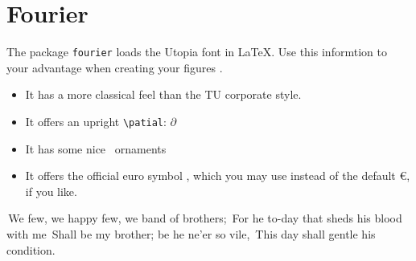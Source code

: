 \section{Fourier}

The package \texttt{fourier} loads the Utopia font in \LaTeX. Use this informtion to your advantage when creating your figures \textthing.

\begin{itemize}
    \renewcommand\labelitemi\lefthand
    \item It has a more classical feel than the TU corporate style.
    \item It offers an upright \verb|\patial|: \(\partial\)
    \item It has some nice \floweroneleft\ ornaments \floweroneright
    \item It offers the official euro symbol \eurologo, which you may use instead of the default €, if you like.
\end{itemize}

\textcolor{newred}{\oldpilcrowfour}\,We few,
we happy few, we band of brothers; \textcolor{newred}
{\oldpilcrowfive}\,For he to-day that sheds his blood with
me \textcolor{newred}{\oldpilcrowsix}\,Shall be my brother;
be he ne'er so vile, \textcolor{newred}
{\oldpilcrowfour}\,This day shall gentle his condition.
